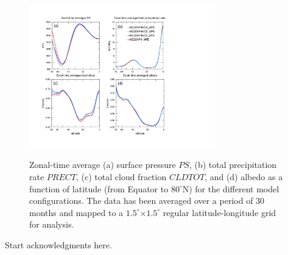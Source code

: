 \documentclass[twocol]{ametsoc}
\begin{document}
\begin{figure}[t]
\noindent\includegraphics[width=19pc,angle=0]{figs/zonal_time_avg_2d_fields.pdf}\\
\caption{Zonal-time average (a) surface pressure $PS$, (b) total precipitation rate $PRECT$, (c) total cloud fraction $CLDTOT$, and (d) albedo as a function of latitude (from Equator to $80^\circ$N) for the different model configurations. The data has been averaged over a period of 30 months and mapped to a $1.5^\circ$$\times$$1.5^\circ$ regular latitude-longitude grid for analysis.}
\end{figure}




%
\acknowledgments
Start acknowledgments here.

%
\end{document}
